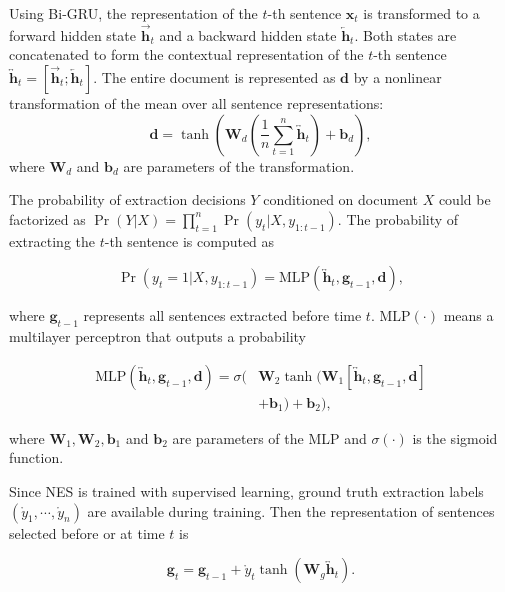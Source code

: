 	Using Bi-GRU, the representation of the $t$-th sentence $\mathbf{x}_t$ is transformed to a forward hidden state $\overrightarrow{\mathbf{h}}_t$ and a backward hidden state $\overleftarrow{\mathbf{h}}_t$. Both states are concatenated to form the contextual representation of the $t$-th sentence $\overleftrightarrow{\mathbf{h}}_t = [\overrightarrow{\mathbf{h}}_t ; \overleftarrow{\mathbf{h}}_t]$. The entire document is represented as $\mathbf{d}$ by a nonlinear transformation of the mean over all sentence representations:
	\[ \mathbf{d} = \tanh( \mathbf{W}_d (\frac{1}{n} \sum_{t=1}^{n} \overleftrightarrow{\mathbf{h}}_t ) + \mathbf{b}_d ) ,\]
	where $\mathbf{W}_d$ and $\mathbf{b}_d$ are parameters of the transformation. 

	The probability of extraction decisions $Y$ conditioned on document $X$ could be factorized as $\Pr(Y|X) = \prod_{t=1}^{n} \Pr(y_t | X, y_{1:t-1})$. The probability of extracting the $t$-th sentence is computed as

\begin{equation} \label{eq:mlp}
		 \Pr(y_t=1|X, y_{1:t-1}) = \text{MLP}(\overleftrightarrow{\mathbf{h}}_t, \mathbf{g}_{t-1}, \mathbf{d} ) ,
	\end{equation}

	where $\mathbf{g}_{t-1}$ represents all sentences extracted before time $t$. $\text{MLP}(\cdot)$ means a multilayer perceptron that outputs a probability

\begin{align*}
	\text{MLP}(\overleftrightarrow{\mathbf{h}}_t, \mathbf{g}_{t-1}, \mathbf{d} ) =  \sigma(  & \mathbf{W}_2 \tanh(\mathbf{W}_1 [\overleftrightarrow{\mathbf{h}}_t, \mathbf{g}_{t-1}, \mathbf{d}] \\
	& + \mathbf{b}_1) + \mathbf{b}_2 ),
	\end{align*}

	where $\mathbf{W}_{1},\mathbf{W}_{2}, \mathbf{b}_{1}$ and $\mathbf{b}_{2}$ are parameters of the MLP and $\sigma(\cdot)$ is the sigmoid function. 

	Since NES is trained with supervised learning, ground truth extraction labels $(\mathring{y}_1, \cdots, \mathring{y}_n)$ are available during training. Then the representation of sentences selected before or at time $t$ is

\begin{equation*}
	\mathbf{g}_t =  \mathbf{g}_{t-1} + \mathring{y}_t \tanh (\mathbf{W}_{g} \overleftrightarrow{\mathbf{h}}_t) .
	\end{equation*}

